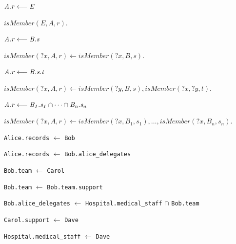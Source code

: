 \begin{cenumerate}
\item $\mathit{A.r} \stackrel{}{\longleftarrow} \mathit{E}$

$\textit{isMember}(E, A, r).$

\item $\mathit{A.r} \stackrel{}{\longleftarrow} \mathit{B.s}$

$\textit{isMember}(\textit{?x}, A, r) \leftarrow
 \textit{isMember}(\textit{?x}, B, s).$

\item $\mathit{A.r} \stackrel{}{\longleftarrow} \mathit{B.s.t}$

$\textit{isMember}(\textit{?x}, A, r) \leftarrow
 \textit{isMember}(\textit{?y}, B, s),
 \textit{isMember}(\textit{?x}, \textit{?y}, t).$

\item $\mathit{A.r} \stackrel{}{\longleftarrow} \mathit{B_1.s_1 \cap \cdots \cap B_n.s_n}$

$\textit{isMember}(\textit{?x}, A, r) \leftarrow
 \textit{isMember}(\textit{?x}, B_1, s_1), \ldots,
 \textit{isMember}(\textit{?x}, B_n, s_n).$
\end{cenumerate}
\stopslide

%
%

\begin{citemize}
\item \texttt{Alice.records} $\leftarrow$ \texttt{Bob}
\item \texttt{Alice.records} $\leftarrow$ \texttt{Bob.alice\_delegates}
\item \texttt{Bob.team} $\leftarrow$ \texttt{Carol}
\item \texttt{Bob.team} $\leftarrow$ \texttt{Bob.team.support}
\item \texttt{Bob.alice\_delegates} $\leftarrow$
  \texttt{Hospital.medical\_staff} $\cap$ \texttt{Bob.team}
\item \texttt{Carol.support} $\leftarrow$ \texttt{Dave}
\item \texttt{Hospital.medical\_staff} $\leftarrow$ \texttt{Dave}
\end{citemize}
\stopslide

